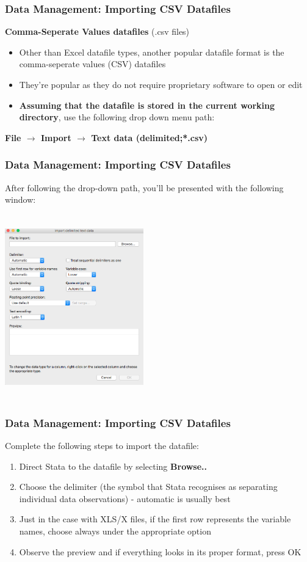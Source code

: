 \documentclass[10pt, compress]{beamer}
\begin{document}
\begin{frame}[fragile]
\frametitle{Data Management: Importing CSV Datafiles}
\textbf{Comma-Seperate Values datafiles} (.csv files)
\begin{itemize}
	\item Other than Excel datafile types, another popular datafile format is the comma-seperate values (CSV) datafiles
	\item They're popular as they \alert{do not require proprietary software to open or edit}
	\item \textbf{Assuming that the datafile is stored in the current working directory}, use the following drop down menu path:
\end{itemize}
\begin{center}
\textbf{File $\to$ Import $\to$ Text data (delimited;*.csv)}
\end{center}
\end{frame}

\begin{frame}[fragile]
\frametitle{Data Management: Importing CSV Datafiles}
 After following the drop-down path, you'll be presented with the following window:
\begin{center}
\includegraphics[width=6cm,height=8cm,keepaspectratio]{csv.png}
\end{center}
\end{frame}

\begin{frame}[fragile]
\frametitle{Data Management: Importing CSV Datafiles}
Complete the following steps to import the datafile:
\begin{enumerate}
	\item Direct Stata to the datafile by selecting \textbf{Browse..}
	\item Choose the delimiter (the symbol that Stata recognises as separating individual data observations) - automatic is usually best
	\item Just in the case with XLS/X files, if the first row represents the variable names, choose always under the appropriate option
	\item Observe the preview and if everything looks in its proper format, press OK 
\end{enumerate}
\end{frame}
\end{document}
